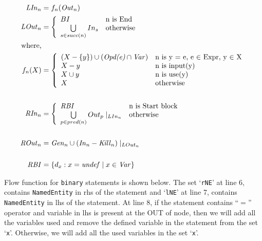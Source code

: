 \documentclass[11pt,a4paper,openright]{report}
\begin{document}
\begin{equation}
\begin{split}
\mbox{\textit{LIn}}_n &= f_n(\mbox{\textit{Out}}_n) \\
\mbox{\textit{LOut}}_n &= \left\{ \begin{array}{ll}
	  BI & \mbox{n is End}\\
	  \bigcup\limits_{s \in succ(n)} In_s & \mbox{otherwise}
	  \end{array} \right.\\ 
\mbox{where,}\\
f_n(X) &= \left\{ \begin{array}{ll}
	  (X-\{y\})\cup(\mbox{\textit{Opd(e)}}\cap \mbox{\textit{Var}}) & \mbox{n is y = e, e $\in$ Expr, y $\in$ X}\\
	  X-{y} & \mbox{n is input(y)}\\
	  X \cup {y} & \mbox{n is use(y)} \\
	  X & \mbox{otherwise}
	  \end{array} \right.\\ 
\\
\mbox{\textit{RIn}}_n &= \left\{ \begin{array}{ll}
	  \mbox{\textit{RBI}} & \mbox{n is Start block}\\
	  \bigcup\limits_{p \in pred(n)}Out_p\mid_{LIn_n} & \mbox{otherwise}
	  \end{array} \right.\\ 
	  \\
\mbox{\textit{ROut}}_n &= \mbox{\textit{Gen}}_n \cup (\mbox{\textit{In}}_n - \mbox{\textit{Kill}}_n) \mid_{LOut_n} \\
\\
\mbox{\textit{RBI}} &= \{d_x : x = \mbox{\textit{undef}} \mid x \in \mbox{\textit{Var}}\} \\	  
\end{split} 
\end{equation}


Flow function for \texttt{binary} statements is shown below. The set `\texttt{rNE}' at line 6, contains \texttt{NamedEntity} in rhs of the statement and `\texttt{lNE}' at line 7, contains
\texttt{NamedEntity} in lhs of the statement. At line 8, if the statement contains ``$=$'' operator and variable in lhs is present at the OUT of node, then we will add
all the variables used and remove the defined variable in the statement from the set `\texttt{x}'. Otherwise, we will add all the used variables in the set
`\texttt{x}'.
\end{document}
